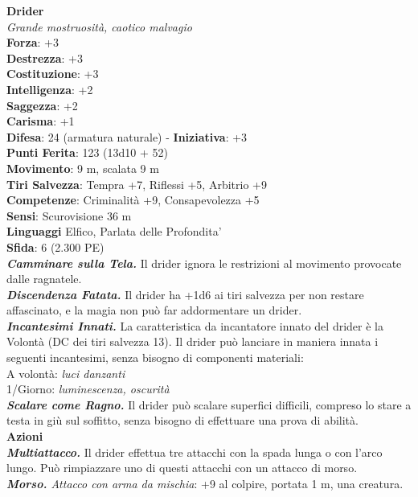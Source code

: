 \begin{multicols}{2}
\medskip\textbf{Drider}\\
\emph{Grande mostruosità, caotico malvagio}\\
\textbf{Forza}: +3\\
\textbf{Destrezza}: +3\\
\textbf{Costituzione}: +3\\
\textbf{Intelligenza}: +2\\
\textbf{Saggezza}: +2\\
\textbf{Carisma}: +1\\
\textbf{Difesa}: 24 (armatura naturale) - \textbf{Iniziativa}: +3\\
\textbf{Punti Ferita}: 123 (13d10 + 52)\\
\textbf{Movimento}: 9 m, scalata 9 m\\
\textbf{Tiri Salvezza}: Tempra +7, Riflessi +5, Arbitrio +9\\
\textbf{Competenze}: Criminalità +9, Consapevolezza +5\\
\textbf{Sensi}: Scurovisione 36 m\\
\textbf{Linguaggi} Elfico, Parlata delle Profondita'\\
\textbf{Sfida}: 6 (2.300 PE)\smallskip\\
\emph{\textbf{Camminare sulla Tela.}} Il drider ignora le restrizioni al movimento provocate dalle ragnatele.\\
\emph{\textbf{Discendenza Fatata.}} Il drider ha +1d6 ai tiri salvezza per non restare affascinato, e la magia non può far addormentare un drider.\\
\emph{\textbf{Incantesimi Innati.}} La caratteristica da incantatore innato del drider è la Volontà (DC dei tiri salvezza 13). Il drider può lanciare in maniera innata i seguenti incantesimi, senza bisogno  di componenti materiali:\\
A volontà: \emph{luci danzanti}\\
1/Giorno: \emph{luminescenza, oscurità}\\
\emph{\textbf{Scalare come Ragno.}} Il drider può scalare superfici difficili, compreso lo stare a testa in giù sul soffitto, senza bisogno di effettuare una prova di abilità.\\
\smallskip\textbf{Azioni}\\
\emph{\textbf{Multiattacco.}} Il drider effettua tre attacchi con la spada lunga o con l'arco lungo. Può rimpiazzare uno di questi attacchi con un attacco di morso.\\
\emph{\textbf{Morso.} Attacco con arma da mischia}: +9 al colpire, portata 1 m, una creatura.\\

\end{multicols}
